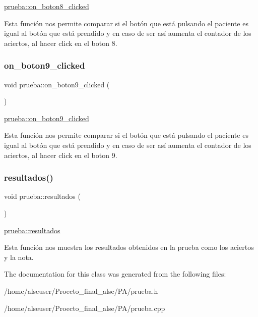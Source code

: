 \hyperlink{classprueba_adead6ef4b051b587a91e3fd1037a65dd}{prueba\+::on\+\_\+boton8\+\_\+clicked} 

Esta función nos permite comparar si el botón que está pulsando el paciente es igual al botón que está prendido y en caso de ser así aumenta el contador de los aciertos, al hacer click en el boton 8. \mbox{\label{classprueba_afb0931a028ade1ee29a8dda28acf1506}} 
\subsubsection{\texorpdfstring{on\+\_\+boton9\+\_\+clicked}{on\_boton9\_clicked}}
{\footnotesize\ttfamily void prueba\+::on\+\_\+boton9\+\_\+clicked (\begin{DoxyParamCaption}{ }\end{DoxyParamCaption})\hspace{0.3cm}{\ttfamily [slot]}}



\hyperlink{classprueba_afb0931a028ade1ee29a8dda28acf1506}{prueba\+::on\+\_\+boton9\+\_\+clicked} 

Esta función nos permite comparar si el botón que está pulsando el paciente es igual al botón que está prendido y en caso de ser así aumenta el contador de los aciertos, al hacer click en el boton 9. \mbox{\label{classprueba_ad26285fa9b7055591708f9a31223353b}} 
\subsubsection{\texorpdfstring{resultados()}{resultados()}}
{\footnotesize\ttfamily void prueba\+::resultados (\begin{DoxyParamCaption}{ }\end{DoxyParamCaption})}



\hyperlink{classprueba_ad26285fa9b7055591708f9a31223353b}{prueba\+::resultados} 

Esta función nos muestra los resultados obtenidos en la prueba como los aciertos y la nota. 

The documentation for this class was generated from the following files\+:\begin{DoxyCompactItemize}
\item 
/home/alseuser/\+Proecto\+\_\+final\+\_\+alse/\+P\+A/prueba.\+h\item 
/home/alseuser/\+Proecto\+\_\+final\+\_\+alse/\+P\+A/prueba.\+cpp\end{DoxyCompactItemize}
